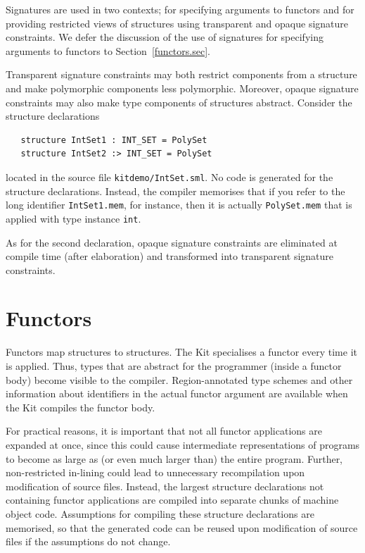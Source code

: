 \documentclass[12pt]{book}
\begin{document}
Signatures are used in two contexts; for specifying arguments to
functors and for providing restricted views of structures using
%
transparent and 
%
opaque signature constraints. We defer the discussion of the use of
signatures for specifying arguments to functors to
Section~\ref{functors.sec}.

Transparent signature constraints may both restrict components from a
structure and make polymorphic components less polymorphic. Moreover,
opaque signature constraints may also make type components of
structures abstract. Consider the structure 
declarations
\begin{verbatim}
   structure IntSet1 : INT_SET = PolySet
   structure IntSet2 :> INT_SET = PolySet
\end{verbatim}

\noindent
located in the source file {\tt kitdemo/IntSet.sml}. No code is
generated for the structure declarations. Instead, the compiler
memorises that if you refer to the long identifier {\tt IntSet1.mem},
for instance, then it is actually {\tt PolySet.mem} that is applied
with type instance {\tt int}.

As for the second declaration, opaque signature constraints are
eliminated at compile time (after elaboration) and transformed into
transparent signature constraints.

\section{Functors \label{functors.sec}}
%
%
Functors map structures to structures. The Kit specialises a functor
every time it is applied.  Thus, types that are abstract for the
programmer (inside a functor body) become visible to the compiler.
Region-annotated type schemes and other information about identifiers
in the actual functor argument are available when the Kit compiles the
functor body.

For practical reasons, it is important that not all functor
applications are expanded at once, since this could cause intermediate
representations of programs to become as large as (or even much larger
than) the entire program. Further, non-restricted in-lining could lead
to unnecessary recompilation upon modification of source files.
Instead, the largest structure declarations not containing functor
applications are compiled into separate chunks of machine object code.
Assumptions for compiling these structure declarations are memorised,
so that the generated code can be reused upon modification of source
files if the assumptions do not change.
\end{document}
